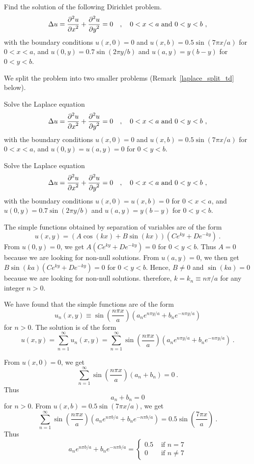\begin{egg}
Find the solution of the following Dirichlet problem.
\label{laplace_split_egg}
\[
\Delta u = \pdydxn{u}{x}{2} + \pdydxn{u}{y}{2} = 0
\quad , \quad 0 < x < a \ \text{and} \ 0 < y < b \ ,
\]
with the boundary conditions
$u(x,0) = 0$ and $u(x,b) = 0.5\sin\left(7\pi x/a\right)$ for
$0<x<a$, and $u(0,y) = 0.7 \sin\left(2\pi y/b\right)$ and
$u(a,y) = y(b-y)$ for $0<y<b$.

We split the problem into two smaller problems
(Remark~\ref{laplace_split_td} below).

Solve the Laplace equation
\[
\Delta u = \pdydxn{u}{x}{2} + \pdydxn{u}{y}{2} = 0
\quad , \quad 0 < x < a \ \text{and} \ 0 < y < b \ ,
\]
with the boundary conditions $u(x,0) = 0$ and
$u(x,b) = 0.5\sin\left(7\pi x/a\right)$ for $0<x<a$, and
$u(0,y) = u(a,y) = 0$ for $0<y<b$.

Solve the Laplace equation
\[
\Delta u = \pdydxn{u}{x}{2} + \pdydxn{u}{y}{2} = 0
\quad , \quad 0 < x < a \ \text{and} \ 0 < y < b \ ,
\]
with the boundary conditions $u(x,0) = u(x,b) = 0$ for  $0<x<a$, and
$u(0,y) = 0.7 \sin\left(2\pi y/b\right)$ and
$u(a,y) = y(b-y)$ for $0<y<b$.

The simple functions obtained by separation of variables are of the
form
\[
u(x,y) = \left( A \cos(kx) + B\sin(kx) \right)
\left(C e^{ky} + D e^{-ky}\right) \ .
\]
From $u(0,y) = 0$, we get $A\left(C e^{ky} + D e^{-ky}\right)=0$ for
$0<y<b$.  Thus $A=0$ because we are looking for non-null solutions.
From $u(a,y) = 0$, we then get
$B\sin(ka)\left(C e^{ky} + D e^{-ky}\right)=0$ for $0<y<b$.  Hence,
$B \neq 0$ and $\sin(ka)=0$ because we are looking for non-null
solutions.  therefore, $k = k_n \equiv n\pi/a$ for any integer $n>0$.

We have found that the simple functions are of the form
\[
u_n(x,y) \equiv \sin\left(\frac{n\pi x}{a}\right)
\left(a_n e^{n\pi y/a} + b_n e^{-n\pi y/a}\right)
\]
for $n > 0$.  The solution is of the form
\[
u(x,y) = \sum_{n=1}^\infty u_n(x,y) = 
\sum_{n=1}^\infty \sin\left(\frac{n\pi x}{a}\right)
\left(a_n e^{n\pi y/a} + b_n e^{-n\pi y/a}\right) \ .
\]

From $u(x,0) = 0$, we get
\[
\sum_{n=1}^\infty \sin\left(\frac{n\pi x}{a}\right)
\left(a_n + b_n \right) = 0 \ .
\]
Thus
\begin{equation} \label{laplace_spv_egg1a}
a_n + b_n = 0 
\end{equation}
for $n > 0$.
From $\displaystyle u(x,b) = 0.5\sin\left(7\pi x/a\right)$, we
get
\[
\sum_{n=1}^\infty \sin\left(\frac{n\pi x}{a}\right)
\left(a_n e^{n\pi b/a} + b_n e^{-n\pi b/a} \right) =
0.5\sin\left(\frac{7\pi x}{a}\right) \  .
\]
Thus
\begin{equation} \label{laplace_spv_egg1b}
a_n e^{n\pi b/a} + b_n e^{-n\pi b/a} = \begin{cases}
0.5 & \text{ if } n = 7 \\
0  & \text{ if } n\neq 7
\end{cases}
\end{equation}


\end{egg}
